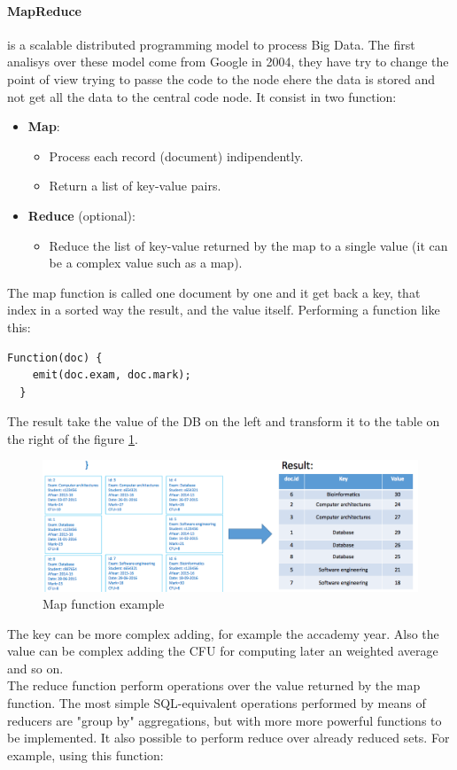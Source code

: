 \documentclass[12pt]{article}
\begin{document}
\paragraph{MapReduce} is a scalable distributed programming model to process Big Data. The first analisys over these model come from Google in 2004, they have try to change the point of view trying to passe the code to the node ehere the data is stored and not get all the data to the central code node. It consist in two function:
\begin{itemize}
  \item \textbf{Map}:
  \begin{itemize}
    \item Process each record (document) indipendently.
    \item Return a list of key-value pairs.
  \end{itemize}
  \item \textbf{Reduce} (optional):
  \begin{itemize}
    \item Reduce the list of key-value returned by the map to a single value (it can be a complex value such as a map).
  \end{itemize}
\end{itemize}
The map function is called one document by one and it get back a key, that index in a sorted way the result, and the value itself. Performing a function like this:
\begin{lstlisting}[frame=single]
  Function(doc) {
    emit(doc.exam, doc.mark);
  }
\end{lstlisting}
The result take the value of the DB on the left and transform it to the table on the right of the figure
\ref{fig:map}.
\begin{figure}[H]
  \includegraphics[width=\linewidth]{images/map.png}
  \caption{Map function example}
  \label{fig:map}
\end{figure}
The key can be more complex adding, for example the accademy year. Also the value can be complex adding the CFU for computing later an weighted average and so on.\\
The reduce function perform operations over the value returned by the map function. The most simple SQL-equivalent operations performed by means of reducers are "group by" aggregations, but with more more powerful functions to be implemented. It also possible to perform reduce over already reduced sets. For example, using this function:
\end{document}

